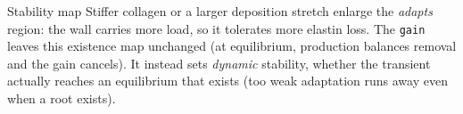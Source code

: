 \begin{frame}[t]{}
  \begin{answerbox}{Stability map}
    Stiffer collagen or a larger deposition stretch enlarge the \emph{adapts}
    region: the wall carries more load, so it tolerates more elastin loss. The
    \texttt{gain} leaves this existence map unchanged (at equilibrium, production
    balances removal and the gain cancels). It instead sets \emph{dynamic}
    stability, whether the transient actually reaches an equilibrium that exists
    (too weak adaptation runs away even when a root exists).
  \end{answerbox}
  \vspace{-0.3em}
\end{frame}

